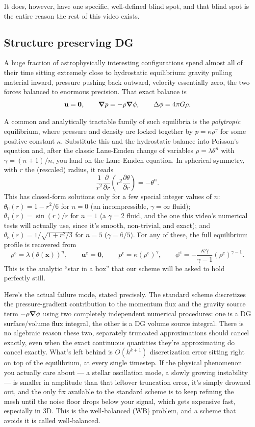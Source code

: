 It does, however, have one specific, well-defined blind spot, and that blind spot is the entire reason the rest of this video exists.

\subsection{Structure preserving DG}

A huge fraction of astrophysically interesting configurations spend almost all of their time sitting extremely close to hydrostatic equilibrium: gravity pulling material inward, pressure pushing back outward, velocity essentially zero, the two forces balanced to enormous precision. That exact balance is
\[
	\mathbf{u} = \mathbf{0}, \qquad \grad p = -\rho \grad \phi, \qquad \Delta\phi = 4\pi G\rho.
\]

A common and analytically tractable family of such equilibria is the \emph{polytropic} equilibrium, where pressure and density are locked together by $p = \kappa \rho^\gamma$ for some positive constant $\kappa$. Substitute this and the hydrostatic balance into Poisson's equation and, after the classic Lane-Emden change of variables $\rho = \lambda\theta^n$ with $\gamma = (n+1)/n$, you land on the Lane-Emden equation. In spherical symmetry, with $r$ the (rescaled) radius, it reads
\[
	\frac{1}{r^2}\frac{\partial}{\partial r}\left(r^2 \frac{\partial\theta}{\partial r}\right) = -\theta^n.
\]
This has closed-form solutions only for a few special integer values of $n$: $\theta_0(r) = 1 - r^2/6$ for $n=0$ (an incompressible, $\gamma=\infty$ fluid); $\theta_1(r) = \sin(r)/r$ for $n=1$ (a $\gamma=2$ fluid, and the one this video's numerical tests will actually use, since it's smooth, non-trivial, and exact); and $\theta_5(r) = 1/\sqrt{1+r^2/3}$ for $n=5$ ($\gamma=6/5$). For any of these, the full equilibrium profile is recovered from
\[
	\rho^e = \lambda\left(\theta(\mathbf{x})\right)^n, \qquad \mathbf{u}^e = \mathbf{0}, \qquad p^e = \kappa(\rho^e)^\gamma, \qquad \phi^e = -\frac{\kappa\gamma}{\gamma-1}(\rho^e)^{\gamma-1}.
\]
This is the analytic ``star in a box'' that our scheme will be asked to hold perfectly still.

Here's the actual failure mode, stated precisely. The standard scheme discretizes the pressure-gradient contribution to the momentum flux and the gravity source term $-\rho\grad\phi$ using two completely independent numerical procedures: one is a DG surface/volume flux integral, the other is a DG volume source integral. There is no algebraic reason these two, separately truncated approximations should cancel exactly, even when the exact continuous quantities they're approximating do cancel exactly. What's left behind is $O(h^{k+1})$ discretization error sitting right on top of the equilibrium, at every single timestep. If the physical phenomenon you actually care about — a stellar oscillation mode, a slowly growing instability — is smaller in amplitude than that leftover truncation error, it's simply drowned out, and the only fix available to the standard scheme is to keep refining the mesh until the noise floor drops below your signal, which gets expensive fast, especially in 3D. This is the well-balanced (WB) problem, and a scheme that avoids it is called well-balanced.

